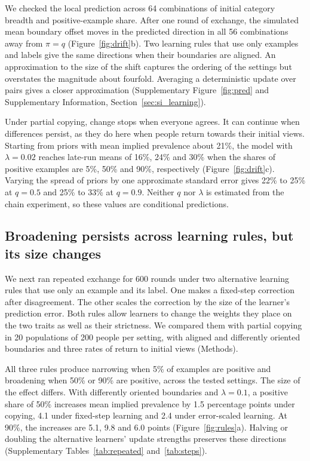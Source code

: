 \documentclass[11pt]{article}
\begin{document}
We checked the local prediction across 64 combinations of initial category breadth and positive-example share. After one round of exchange, the simulated mean boundary offset moves in the predicted direction in all 56 combinations away from $\pi=q$ (Figure~\ref{fig:drift}b). Two learning rules that use only examples and labels give the same directions when their boundaries are aligned. An approximation to the size of the shift captures the ordering of the settings but overstates the magnitude about fourfold. Averaging a deterministic update over pairs gives a closer approximation (Supplementary Figure~\ref{fig:pred} and Supplementary Information, Section~\ref{sec:si_learning}).

Under partial copying, change stops when everyone agrees. It can continue when differences persist, as they do here when people return towards their initial views. Starting from priors with mean implied prevalence about 21\%, the model with $\lambda=0.02$ reaches late-run means of 16\%, 24\% and 30\% when the shares of positive examples are 5\%, 50\% and 90\%, respectively (Figure~\ref{fig:drift}c). Varying the spread of priors by one approximate standard error gives 22\% to 25\% at $q=0.5$ and 25\% to 33\% at $q=0.9$. Neither $q$ nor $\lambda$ is estimated from the chain experiment, so these values are conditional predictions.

\subsection{Broadening persists across learning rules, but its size changes}

We next ran repeated exchange for 600 rounds under two alternative learning rules that use only an example and its label. One makes a fixed-step correction after disagreement. The other scales the correction by the size of the learner's prediction error. Both rules allow learners to change the weights they place on the two traits as well as their strictness. We compared them with partial copying in 20 populations of 200 people per setting, with aligned and differently oriented boundaries and three rates of return to initial views (Methods).

All three rules produce narrowing when 5\% of examples are positive and broadening when 50\% or 90\% are positive, across the tested settings. The size of the effect differs. With differently oriented boundaries and $\lambda=0.1$, a positive share of 50\% increases mean implied prevalence by 1.5 percentage points under copying, 4.1 under fixed-step learning and 2.4 under error-scaled learning. At 90\%, the increases are 5.1, 9.8 and 6.0 points (Figure~\ref{fig:rules}a). Halving or doubling the alternative learners' update strengths preserves these directions (Supplementary Tables~\ref{tab:repeated} and~\ref{tab:steps}).
\end{document}
